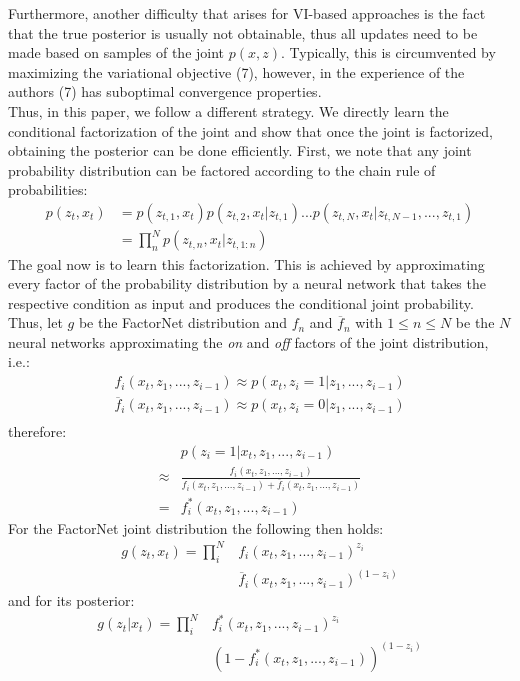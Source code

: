 Furthermore, another difficulty that arises for VI-based approaches is the fact that the true posterior is usually not obtainable, thus all updates need to be made based on samples of the joint $p(x,z)$. Typically, this is circumvented by maximizing the variational objective (7), however, in the experience of the authors (7) has suboptimal convergence properties.\\
Thus, in this paper, we follow a different strategy. We directly learn the conditional factorization of the joint and show that once the joint is factorized, obtaining the posterior can be done efficiently. First, we note that any joint probability distribution can be factored according to the chain rule of probabilities:
\begin{align*}
p(z_{t}, x_{t}) &= p(z_{t,1},x_t)p(z_{t,2}, x_t|z_{t,1}) ... p(z_{t,N}, x_t| z_{t,N-1}, ..., z_{t,1})\\
		    &= \prod_n^N p(z_{t,n}, x_t|z_{t,1:n})
\end{align*}
The goal now is to learn this factorization. This is achieved by approximating every factor of the probability distribution by a neural network that takes the respective condition as input and produces the conditional joint probability. Thus, let $g$ be the FactorNet distribution and $f_n$ and $\overline{f}_n$ with $1 \leq n \leq N$ be the $N$ neural networks approximating the \emph{on} and \emph{off} factors of the joint distribution, i.e.:
\begin{align*}
f_i(x_t, z_1, ..., z_{i-1}) \approx p(x_t, z_{i} = 1 | z_1, ..., z_{i-1})\\
\overline{f}_i(x_t, z_1, ..., z_{i-1}) \approx p(x_t, z_{i} = 0 | z_1, ..., z_{i-1})\\
\end{align*}
therefore:
\begin{align*}
&p(z_i = 1 | x_t, z_1, ..., z_{i-1}) \\
\approx &\frac{f_i(x_t, z_1, ..., z_{i-1})}{f_i(x_t, z_1, ..., z_{i-1}) + \overline{f}_i(x_t, z_1, ..., z_{i-1})}\\
= &f^*_i(x_t, z_1, ..., z_{i-1})
\end{align*}
For the FactorNet joint distribution the following then holds:
\begin{align*}
g(z_{t}, x_{t}) = \prod_i^N &f_i(x_t, z_1, ..., z_{i-1})^{z_i} \\
			& \overline{f}_i(x_t, z_1, ..., z_{i-1})^{(1-z_i)}
\end{align*} 
and for its posterior:
\begin{align*}
g(z_{t}| x_{t}) = \prod_i^N &f^*_i(x_t, z_1, ..., z_{i-1})^{z_i} \\
			&(1- f^*_i(x_t, z_1, ..., z_{i-1}))^{(1-z_i)}
\end{align*} 
